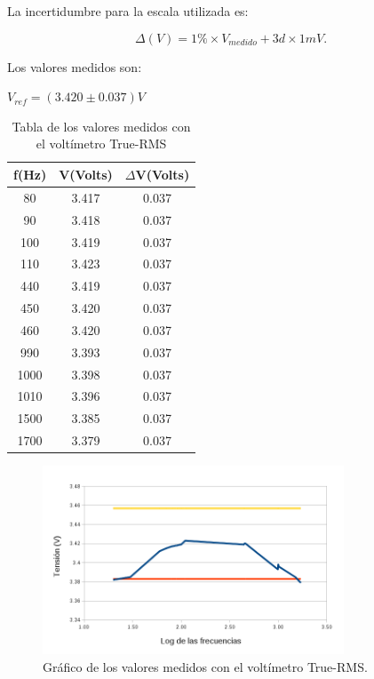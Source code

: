 \documentclass{article}
\begin{document}
La incertidumbre para la escala utilizada es:

\begin{equation}
 	\Delta(V) = 1\%\times V_{medido} + 3d\times 1mV.
\end{equation}
\medskip

Los valores medidos son:

\begin{center}
$V_{ref} = (3.420 \pm 0.037) V$
\end{center}

\begin{table}[!hbt]
	\begin{center}
	\begin{tabular}{|c|c|c|}\hline
	\textbf{f(Hz)} & \textbf{V(Volts)} & \textbf{$\Delta$V(Volts)} \\ \hline
	80 & 3.417 & 0.037\\ \hline
    90 & 3.418 & 0.037\\ \hline
    100 & 3.419 & 0.037\\ \hline
	110 & 3.423 & 0.037\\ \hline
	440 & 3.419 & 0.037\\ \hline
	450 & 3.420 & 0.037\\ \hline
	460 & 3.420 & 0.037\\ \hline
	990 & 3.393 & 0.037\\ \hline
	1000 & 3.398 & 0.037\\ \hline
	1010& 3.396 & 0.037\\ \hline
	1500 & 3.385 & 0.037\\ \hline
	1700 & 3.379 & 0.037\\ \hline
	\end{tabular}
	\caption{Tabla de los valores medidos con el voltímetro True-RMS}
	\end{center}
\end{table}
\bigskip

\begin{figure}[h!tbp]
\centering
\includegraphics[width=0.80\textwidth]{images/tablaTRUE.png}
\caption{Gráfico de los valores medidos con el voltímetro True-RMS.}
\end{figure}
\bigskip
\end{document}
